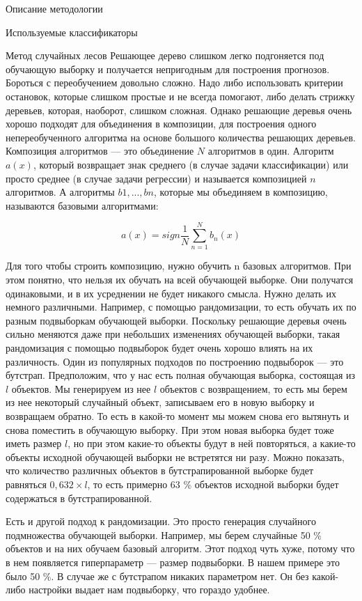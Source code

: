 \begin{section}{Описание методологии}
\begin{subsection}{Используемые классификаторы}
    \begin{subsubsection}{Метод случайных лесов}
	\label{rf}
      Решающее дерево слишком легко подгоняется под обучающую выборку и получается непригодным для построения прогнозов. Бороться с переобучением довольно сложно. Надо либо использовать критерии остановок, которые слишком простые и не всегда помогают, либо делать стрижку деревьев, которая, наоборот, слишком сложная. Однако решающие деревья очень хорошо подходят для объединения в композиции, для построения одного непереобученного алгоритма на основе большого количества решающих деревьев. Композиция алгоритмов — это объединение $N$ алгоритмов в один. Алгоритм $a(x)$, который возвращает знак среднего (в случае задачи классификации) или просто среднее (в случае задачи регрессии) и называется композицией $n$ алгоритмов. А алгоритмы $b1, ..., bn$, которые мы объединяем в композицию, называются базовыми алгоритмами:

		\begin{equation}
		a(x) = sign \frac{1}{N}  \sum\limits_{n=1}^N b_n(x)
		\end{equation}

 Для того чтобы строить композицию, нужно обучить n базовых алгоритмов. При этом понятно, что нельзя их обучать на всей обучающей выборке. Они получатся одинаковыми, и в их усреднении не будет никакого смысла. Нужно делать их немного различными. Например, с помощью рандомизации, то есть обучать их по разным подвыборкам обучающей выборки. Поскольку решающие деревья очень сильно меняются даже при небольших изменениях обучающей выборки, такая рандомизация с помощью подвыборок будет очень хорошо влиять на их различность. Один из популярных подходов по построению подвыборок — это бутстрап. Предположим, что у нас есть полная обучающая выборка, состоящая из $l$ объектов. Мы генерируем из нее $l$ объектов с возвращением, то есть мы берем из нее некоторый случайный объект, записываем его в новую выборку и возвращаем обратно. То есть в какой-то момент мы можем снова его вытянуть и снова поместить в обучающую выборку. При этом новая выборка будет тоже иметь размер $l$, но при этом какие-то объекты будут в ней повторяться, а какие-то объекты исходной обучающей выборки не встретятся ни разу.  Можно показать, что количество различных объектов в бутстрапированной выборке будет равняться $0,632 \times l$, то есть примерно 63 \% объектов исходной выборки будет содержаться в бутстрапированной.

 Есть и другой подход к рандомизации. Это просто генерация случайного подмножества обучающей выборки. Например, мы берем случайные 50 \% объектов и на них обучаем базовый алгоритм. Этот подход чуть хуже, потому что в нем появляется гиперпараметр — размер подвыборки. В нашем примере это было 50 \%. В случае же с бутстрапом никаких параметром нет. Он без какой-либо настройки выдает нам подвыборку, что гораздо удобнее.


\end{subsubsection}
\end{subsection}
\end{section}
